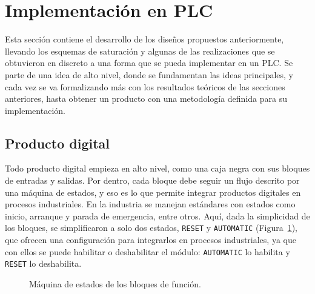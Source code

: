 \section{Implementación en PLC}
\label{sec:impl_plc}
\label{sec:met_plc}
Esta sección contiene el desarrollo de los diseños propuestos anteriormente, llevando los esquemas
de saturación y algunas de las realizaciones que se obtuvieron en discreto a una forma que se pueda
implementar en un PLC. Se parte de una idea de alto nivel, donde se fundamentan las ideas
principales, y cada vez se va formalizando más con los resultados teóricos de las secciones
anteriores, hasta obtener un producto con una metodología definida para su implementación.

\subsection{Producto digital}
\label{subsec:plc_producto}

Todo producto digital empieza en alto nivel, como una caja negra con sus bloques de entradas y
salidas. Por dentro, cada bloque debe seguir un flujo descrito por una máquina de estados, y eso es
lo que permite integrar productos digitales en procesos industriales. En la industria se manejan
estándares con estados como inicio, arranque y parada de emergencia, entre otros. Aquí, dada la
simplicidad de los bloques, se simplificaron a solo dos estados, \texttt{RESET} y \texttt{AUTOMATIC}
(Figura~\ref{fig:plc_estados}), que ofrecen una configuración para integrarlos en procesos
industriales, ya que con ellos se puede habilitar o deshabilitar el módulo: \texttt{AUTOMATIC} lo
habilita y \texttt{RESET} lo deshabilita.


\begin{figure}[H]
  \centering
  \caption[Máquina de estados de los bloques de función]{Máquina de estados de los bloques de
    función.}
  \label{fig:plc_estados}
\end{figure}

